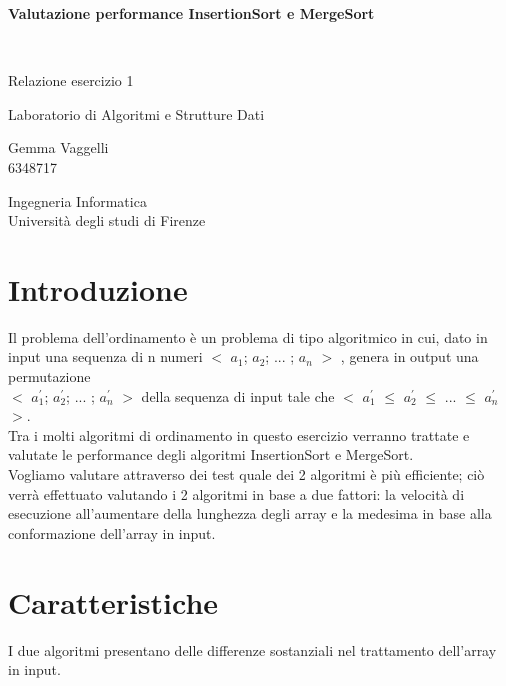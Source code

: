 \documentclass[12pt]{article}
\begin{document}
\begin{titlepage}
   \begin{center}
       \vspace*{1cm}
	   \begin{Huge}
       \textbf{Valutazione performance InsertionSort e MergeSort}
	   \end{Huge}
       \vspace{1.5cm}
       \\
       \begin{Large}
        Relazione esercizio 1
            
       \vspace{1.5cm}

       Laboratorio di Algoritmi e Strutture Dati
	   \vspace{3cm}
            
       Gemma Vaggelli \\
       6348717
            
       \vfill
     
    
            
       Ingegneria Informatica\\
       Università degli studi di Firenze
       \end{Large}
       
            
   \end{center}
\end{titlepage}
\section{Introduzione}
Il problema dell'ordinamento è un problema di tipo algoritmico in cui, dato in input una sequenza di n numeri $<$ $a_1$; $a_2$; ... ; $a_n$ $>$ , genera in output una permutazione \\$<$ $a_1^{'}$; $a_2^{'}$; ... ; $a_n^{'}$ $>$ della sequenza di input tale che $<$ $a_1^{'}$ $\le$ $a_2^{'}$ $\le$ ... $\le$ $a_n^{'}$ $>$.
\\Tra i molti algoritmi di ordinamento in questo esercizio verranno trattate e valutate le performance degli algoritmi InsertionSort e MergeSort. 
\\Vogliamo valutare attraverso dei test quale dei 2 algoritmi è più efficiente; ciò verrà effettuato valutando i 2 algoritmi in base a due fattori: la velocità di esecuzione all'aumentare della lunghezza degli array e la medesima in base alla conformazione dell'array in input.

\section{Caratteristiche}
I due algoritmi presentano delle differenze sostanziali nel trattamento dell'array in input.
\end{document}
